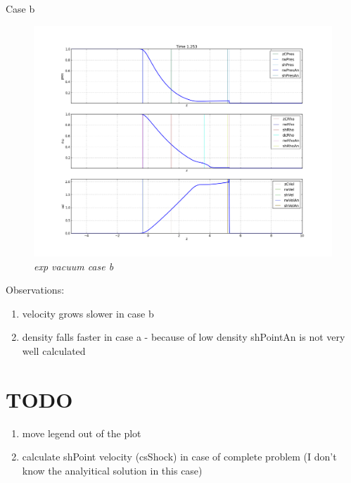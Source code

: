\documentclass[12pt]{book}
\begin{document}
Case b

\begin{figure}[!h]
 \centering
 \includegraphics[scale=0.4]{exp_vacuum_b.png}
	\caption{\emph{exp vacuum case b}}
\end{figure}

Observations:
\begin{enumerate}
\item velocity grows slower in case b
\item density falls faster in case a 	- because of low density shPointAn is not very well calculated
\end{enumerate}

\section*{TODO}

\begin{enumerate}
\item move legend out of the plot
\item calculate shPoint velocity (csShock) in case of complete problem (I don't know the analyitical solution in this case)	
\end{enumerate}
\end{document}
